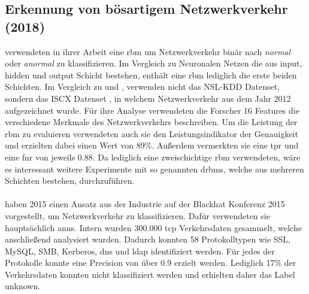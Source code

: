 \documentclass[
    12pt, %
    DIV10,
    ngerman, %
    a4paper, %
    oneside, %
    titlepage, %
    parskip=half, %
    headings=normal, %
    listof=totoc, %
    bibliography=totoc, %
    index=totoc, %
    captions=tableheading, %
    final %
]{scrreprt}
\begin{document}
\subsection{Erkennung von bösartigem Netzwerkverkehr (2018)}\label{iscx1}
\textcite{Aldwairi2018} verwendeten in ihrer Arbeit eine \ac{rbm} um Netzwerkverkehr binär nach \emph{normal} oder \emph{anormal} zu klassifizieren. Im Vergleich zu Neuronalen Netzen die aus input, hidden und output Schicht bestehen, enthält eine \ac{rbm} lediglich die erste beiden Schichten. Im Vergleich zu \textcite{Yin2017} und \textcite{Ding2018}, verwenden \textcite{Aldwairi2018} nicht das NSL-KDD Datenset, sondern das ISCX Datenset \parencite{shiravi2012toward}, in welchem Netzwerkverkehr aus dem Jahr 2012 aufgezeichnet wurde. Für ihre Analyse verwendeten die Forscher 16 Features die verschiedene Merkmale des Netzwerkverkehrs beschreiben.  Um die Leistung der \ac{rbm} zu evaluieren verwendeten auch sie den Leistungsindikator der Genauigkeit und erzielten dabei einen Wert von 89\%. Au{\ss}erdem vermerkten sie eine \ac{tpr} und eine \ac{fnr} von jeweils 0.88. Da \textcite{Aldwairi2018} lediglich eine zweischichtige \ac{rbm} verwendeten, wäre es interessant weitere Experimente mit so genannten \ac{drbms}, welche aus mehreren Schichten bestehen, durchzuführen.
\\\\
\textcite{Wang2015} haben 2015 einen Ansatz aus der Industrie auf der Blackhat Konferenz 2015 vorgestellt, um Netzwerkverkehr zu klassifizieren. Dafür verwendeten sie hauptsächlich \ac{anns}. Intern wurden 300.000 \ac{tcp} Verkehrsdaten gesammelt, welche anschlie{\ss}end analysiert wurden. Dadurch konnten 58 Protokolltypen wie SSL, MySQL, SMB, Kerberos, \ac{dns} und \ac{ldap} identifiziert werden. Für jedes der Protokolle konnte eine Precision von über 0.9 erzielt werden. Lediglich 17\% der Verkehrsdaten konnten nicht klassifiziert werden und erhielten daher das Label \glqq unknown\grqq.

%
\end{document}
